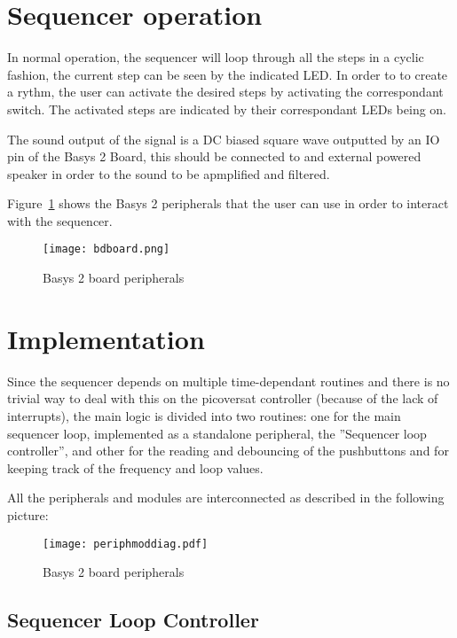 
\section{Sequencer operation}



In normal operation, the sequencer will loop through all the steps in a cyclic fashion, the current step can be seen by the indicated LED. In order to to create a rythm, the user can activate the desired steps by activating the correspondant switch. The activated steps are indicated by their correspondant LEDs being on.  

The sound output of the signal is a DC biased square wave outputted by an IO pin of the Basys 2 Board, this should be connected to and external powered speaker in order to the sound to be apmplified and filtered.


Figure~\ref{fig:bdbasys2} shows the Basys 2 peripherals that the user can use in order to interact with the sequencer.

\begin{figure}[!h]
  \centerline{\texttt{[image: bdboard.png]}}
  \vspace{0cm}\caption{Basys 2 board peripherals}
  \label{fig:bdbasys2}
\end{figure}

\section{Implementation}


Since the sequencer depends on multiple time-dependant routines and there is no trivial way to deal with this on the picoversat controller (because of the lack of interrupts), the main logic is divided into two routines: one for the main sequencer loop, implemented as a standalone peripheral, the ''Sequencer loop controller'', and other for the reading and debouncing of the pushbuttons and for keeping track of the frequency and loop values.


\noindent All the peripherals and modules are interconnected as described in the following picture:

\begin{figure}[!htbp]
  \centerline{\texttt{[image: periphmoddiag.pdf]}}
  \vspace{0cm}\caption{Basys 2 board peripherals}
  \label{fig:periphmoddiag}
\end{figure}


\subsection{Sequencer Loop Controller}



